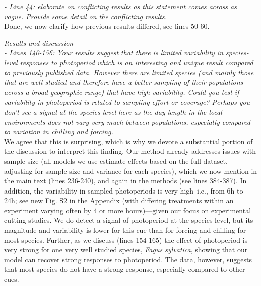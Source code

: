 \documentclass[11pt]{article}
\begin{document}
\emph{- Line 44: elaborate on conflicting results as this statement comes across as vague. Provide some detail on the conflicting results.}\\
Done, we now clarify how previous results differed, see lines 50-60.

\emph{Results and discussion}\\
\emph{- Lines 140-156: Your results suggest that there is limited variability in species-level responses to photoperiod which is an interesting and unique result compared to previously published data. However there are limited species (and mainly those that are well studied and therefore have a better sampling of their populations across a broad geographic range) that have high variability. Could you test if variability in photoperiod is related to sampling effort or coverage? Perhaps you don’t see a signal at the species-level here as the day-length in the local environments does not vary very much between populations, especially compared to variation in chilling and forcing.}\\

We agree that this is surprising, which is why we devote a substantial portion of the discussion to interpret this finding. Our method already addresses issues with sample size (all models we use estimate effects based on the full dataset, adjusting for sample size and variance for each species), which we now mention in the main text (lines 236-240), and again in the methods (see lines 384-387). In addition, the variability in sampled photoperiods is very high--i.e., from 6h to 24h; see new Fig. S2 in the Appendix (with differing treatments within an experiment varying often by 4 or more hours)---given our focus on experimental cutting studies. We do detect a signal of photoperiod at the species-level, but its magnitude and variability is lower for this cue than for forcing and chilling for most species. Further, as we discuss (lines 154-165) the effect of photoperiod is very strong for one very well studied species, \emph{Fagus sylvatica}, showing that our model can recover strong responses to photoperiod. The data, however, suggests that most species do not have a strong response, especially compared to other cues. \\
\end{document}
